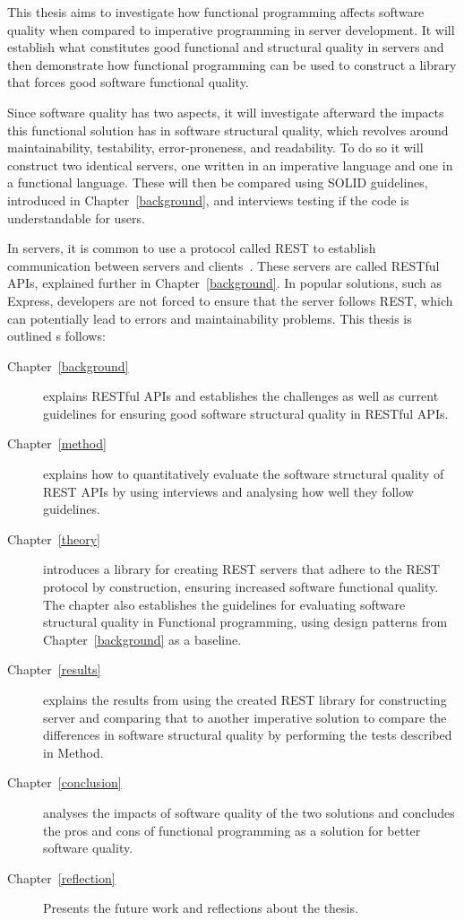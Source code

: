 This thesis aims to investigate how functional programming affects software
quality when compared to imperative programming in server development.  It will
establish what constitutes good functional and structural quality in servers and
then demonstrate how functional programming can be used to construct a library
that forces good software functional quality. 

Since software quality has two aspects, it will investigate afterward the
impacts this functional solution has in software structural quality, which
revolves around maintainability, testability, error-proneness, and readability.
To do so it will construct two identical servers, one written in an imperative
language and one in a functional language.  These will then be compared using
SOLID guidelines, introduced in Chapter~\ref{background}, and interviews testing
if the code is understandable for users.

In servers, it is common to use a protocol called REST to establish
communication between servers and clients~\cite{battle2008bridging}. These
servers are called RESTful APIs, explained further in Chapter~\ref{background}.
In popular solutions, such as Express, developers are not forced to ensure that
the server follows REST, which can potentially lead to errors and
maintainability problems.  This thesis is outlined s follows:

\begin{description}
    \item[Chapter~\ref{background}] explains RESTful APIs and establishes the
    challenges as well as current guidelines for ensuring good software
    structural quality in RESTful APIs. 
    \item[Chapter~\ref{method}] explains how to quantitatively evaluate the
    software structural quality of REST APIs by using interviews and analysing
    how well they follow guidelines. 
    \item[Chapter~\ref{theory}] introduces a library for creating REST servers
    that adhere to the REST protocol by construction, ensuring increased
    software functional quality. The chapter also establishes the guidelines for
    evaluating software structural quality in Functional programming, using
    design patterns from Chapter~\ref{background} as a baseline.   
    \item[Chapter~\ref{results}] explains the results from using the created
    REST library for constructing server and comparing that to another
    imperative solution to compare the differences in software structural
    quality by performing the tests described in Method.
    \item[Chapter~\ref{conclusion}] analyses the impacts of software quality of
    the two solutions and concludes the pros and cons of functional programming
    as a solution for better software quality.
    \item[Chapter~\ref{reflection}] Presents the future work and reflections
    about the thesis.
\end{description}

